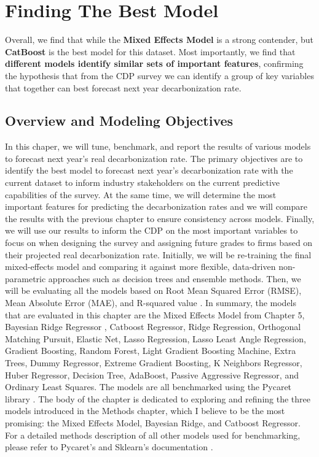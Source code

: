\chapter{Finding The Best Model}

\begin{keytakeaway}
    Overall, we find that while the \textbf{Mixed Effects Model} is a strong contender, but \textbf{CatBoost} is the best model for this dataset. Most importantly, we find that \textbf{different models identify similar sets of important features}, confirming the hypothesis that from the CDP survey we can identify a group of key variables that together can best forecast next year decarbonization rate.
\end{keytakeaway}



\section{Overview and Modeling Objectives}
In this chaper, we will tune, benchmark, and report the results of various models to forecast next year's real decarbonization rate. The primary objectives are to identify the best model to forecast next year's decarbonization rate with the current dataset to inform industry stakeholders on the current predictive capabilities of the survey. At the same time, we will determine the most important features for predicting the decarbonization rates and we will compare the results with the previous chapter to ensure consistency across models. Finally, we will use our results to inform the CDP on the most important variables to focus on when designing the survey and assigning future grades to firms based on their projected real decarbonization rate. Initially, we will be re-training the final mixed-effects model and comparing it against more flexible, data-driven non-parametric approaches such as decision trees and ensemble methods. Then, we will be evaluating all the models based on Root Mean Squared Error (RMSE), Mean Absolute Error (MAE), and R-squared value \cite{gmd}. In summary, the models that are evaluated in this chapter are the Mixed Effects Model from Chapter 5, Bayesian Ridge Regressor , Catboost Regressor, Ridge Regression, Orthogonal Matching Pursuit, Elastic Net, Lasso Regression, Lasso Least Angle Regression, Gradient Boosting, Random Forest, Light Gradient Boosting Machine, Extra Trees, Dummy Regressor, Extreme Gradient Boosting, K Neighbors Regressor, Huber Regressor, Decision Tree, AdaBoost, Passive Aggressive Regressor, and Ordinary Least Squares. The models are all benchmarked using the Pycaret library \cite{pycaret}. The body of the chapter is dedicated to  exploring and refining the three models introduced in the Methods chapter, which I believe to be the most promising: the Mixed Effects Model, Bayesian Ridge, and Catboost Regressor. For a detailed methods description of all other models used for benchmarking, please refer to Pycaret's and Sklearn's documentation \cite{pycaret,scikit-learn}.



